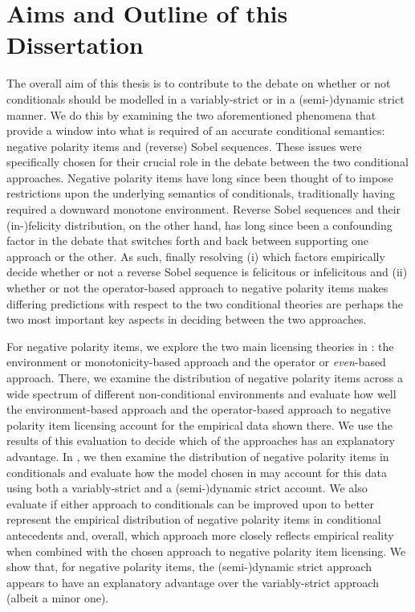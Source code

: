 \section{Aims and Outline of this Dissertation}
The overall aim of this thesis is to contribute to the debate on whether or not conditionals should be modelled in a variably-strict or in a (semi-)dynamic strict manner. We do this by examining the two aforementioned phenomena that provide a window into what is required of an accurate conditional semantics: negative polarity items and (reverse) Sobel sequences. These issues were specifically chosen for their crucial role in the debate between the two conditional approaches. Negative polarity items have long since been thought of to impose restrictions upon the underlying semantics of conditionals, traditionally having required a downward monotone environment. Reverse Sobel sequences and their (in-)felicity distribution, on the other hand, has long since been a confounding factor in the debate that switches forth and back between supporting one approach or the other. As such, finally resolving (i) which factors empirically decide whether or not a reverse Sobel sequence is felicitous or infelicitous and (ii) whether or not the operator-based approach to negative polarity items makes differing predictions with respect to the two conditional theories are perhaps the two most important key aspects in deciding between the two approaches.

For negative polarity items, we explore the two main licensing theories in : the environment or monotonicity-based approach and the operator or \textit{even}-based approach. There, we examine the distribution of negative polarity items across a wide spectrum of different non-conditional environments and evaluate how well the environment-based approach and the operator-based approach to negative polarity item licensing account for the empirical data shown there. We use the results of this evaluation to decide which of the approaches has an explanatory advantage. In , we then examine the distribution of negative polarity items in conditionals and evaluate how the model chosen in  may account for this data using both a variably-strict and a (semi-)dynamic strict account. We also evaluate if either approach to conditionals can be improved upon to better represent the empirical distribution of negative polarity items in conditional antecedents and, overall, which approach more closely reflects empirical reality when combined with the chosen approach to negative polarity item licensing. We show that, for negative polarity items, the (semi-)dynamic strict approach appears to have an explanatory advantage over the variably-strict approach (albeit a minor one).

